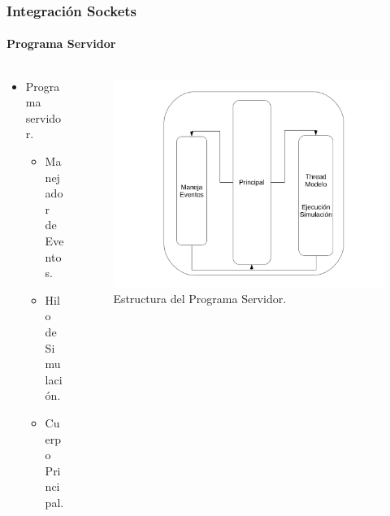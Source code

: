 \documentclass[spanish,xcolor=dvipsnames]{beamer}
\begin{document}
    \begin{frame}
    	\frametitle{Integración Sockets}
    	\framesubtitle{Programa Servidor}
    	
    	\begin{columns}
    		\begin{column}{.3\linewidth}
    			\begin{itemize}
    				\item Programa servidor.
    				\begin{itemize}
    					\item Manejador de Eventos.
    					\item Hilo de Simulación.
    					\item Cuerpo Principal.
    				\end{itemize}
    			\end{itemize}
    		\end{column}
    		\begin{column}{.7\linewidth}
    			\begin{figure}[H]
    				\centering
    				\includegraphics[scale=0.25]{img/estructuraProgramaServidor.png}
    				\caption{Estructura del Programa Servidor.}
    				\label{estructuraProgramaServidor}
    			\end{figure}
    		\end{column}
    	\end{columns}
    \end{frame}
\end{document}
